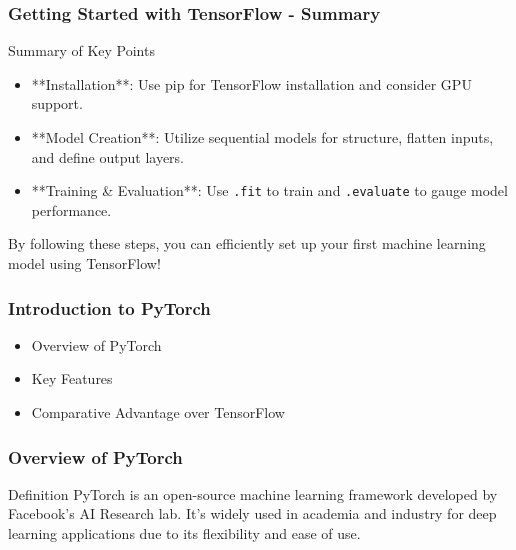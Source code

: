 \documentclass{beamer}
\begin{document}
\begin{frame}[fragile]
    \frametitle{Getting Started with TensorFlow - Summary}
    \begin{block}{Summary of Key Points}
        \begin{itemize}
            \item **Installation**: Use pip for TensorFlow installation and consider GPU support.
            \item **Model Creation**: Utilize sequential models for structure, flatten inputs, and define output layers.
            \item **Training \& Evaluation**: Use \texttt{.fit} to train and \texttt{.evaluate} to gauge model performance.
        \end{itemize}
    \end{block}
    By following these steps, you can efficiently set up your first machine learning model using TensorFlow!
\end{frame}

\begin{frame}
    \frametitle{Introduction to PyTorch}
    \begin{itemize}
        \item Overview of PyTorch
        \item Key Features
        \item Comparative Advantage over TensorFlow
    \end{itemize}
\end{frame}

\begin{frame}
    \frametitle{Overview of PyTorch}
    \begin{block}{Definition}
        PyTorch is an open-source machine learning framework developed by Facebook's AI Research lab. It's widely used in academia and industry for deep learning applications due to its flexibility and ease of use.
    \end{block}
\end{frame}
\end{document}
